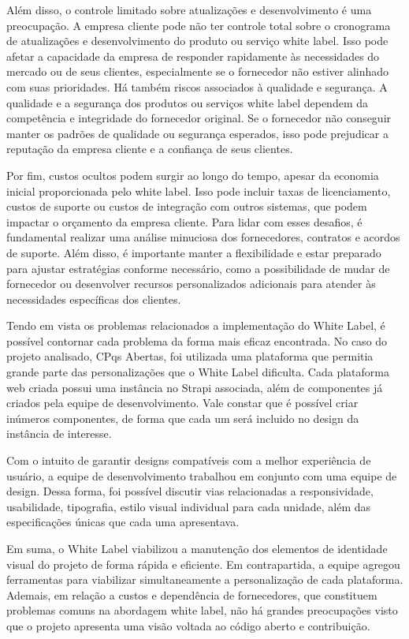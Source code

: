 Além disso, o controle limitado sobre atualizações e desenvolvimento é uma preocupação. A empresa cliente pode não ter controle total sobre o cronograma de atualizações e desenvolvimento do produto ou serviço white label. Isso pode afetar a capacidade da empresa de responder rapidamente às necessidades do mercado ou de seus clientes, especialmente se o fornecedor não estiver alinhado com suas prioridades. Há também riscos associados à qualidade e segurança. A qualidade e a segurança dos produtos ou serviços white label dependem da competência e integridade do fornecedor original. Se o fornecedor não conseguir manter os padrões de qualidade ou segurança esperados, isso pode prejudicar a reputação da empresa cliente e a confiança de seus clientes.

Por fim, custos ocultos podem surgir ao longo do tempo, apesar da economia inicial proporcionada pelo white label. Isso pode incluir taxas de licenciamento, custos de suporte ou custos de integração com outros sistemas, que podem impactar o orçamento da empresa cliente. Para lidar com esses desafios, é fundamental realizar uma análise minuciosa dos fornecedores, contratos e acordos de suporte. Além disso, é importante manter a flexibilidade e estar preparado para ajustar estratégias conforme necessário, como a possibilidade de mudar de fornecedor ou desenvolver recursos personalizados adicionais para atender às necessidades específicas dos clientes.

Tendo em vista os problemas relacionados a implementação do White Label, é possível contornar cada problema da forma mais eficaz encontrada. No caso do projeto analisado, CPqs Abertas, foi utilizada uma plataforma que permitia grande parte das personalizações que o White Label dificulta. Cada plataforma web criada possui uma instância no Strapi associada, além de componentes já criados pela equipe de desenvolvimento. Vale constar que é possível criar inúmeros componentes, de forma que cada um será incluido no design da instância de interesse. 

Com o intuito de garantir designs compatíveis com a melhor experiência de usuário, a equipe de desenvolvimento trabalhou em conjunto com uma equipe de design. Dessa forma, foi possível discutir vias relacionadas a responsividade, usabilidade, tipografia, estilo visual individual para cada unidade, além das especificações únicas que cada uma apresentava. 

Em suma, o White Label viabilizou a manutenção dos elementos de identidade visual do projeto de forma rápida e eficiente. Em contrapartida, a equipe agregou ferramentas para viabilizar simultaneamente a personalização de cada plataforma. Ademais, em relação a custos e dependência de fornecedores, que constituem problemas comuns na abordagem white label, não há grandes preocupações visto que o projeto apresenta uma visão voltada ao código aberto e contribuição. 

